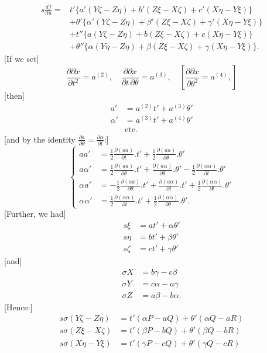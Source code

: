 %
\noindent [hence, by 12:]
\[
\begin{aligned}
s\frac{df}{du}={}&t'\{a'(Y\zeta-Z\eta)+b'(Z\xi-X\zeta)+c'(X\eta-Y\xi)\}\\
&+\theta'\{\alpha'(Y\zeta-Z\eta)+\beta'(Z\xi-X\zeta)+\gamma'(X\eta-Y\xi)\}\\
&+t''\{a(Y\zeta-Z\eta)+b(Z\xi-X\zeta)+c(X\eta-Y\xi)\}\\
&+\theta''\{\alpha(Y\eta-Z\eta)+\beta(Z\xi-X\zeta)+\gamma(X\eta-Y\xi)\}.
\end{aligned}
\]
[If we set]
\[
\frac{\partial\partial x}{\partial t^2}=a^{(2)},\quad
\frac{\partial\partial x}{\partial t\,\partial\theta}=a^{(3)},\quad
\left[\frac{\partial\partial x}{\partial\theta^2}=a^{(4)},\right]
\]
[then]
\[
\begin{aligned}
a'&=a^{(2)}t'+a^{(3)}\theta'\\
\alpha'&=a^{(3)}t'+a^{(4)}\theta'\\
&\text{etc.}
\end{aligned}
\]
[and by the identity $\frac{\partial a}{\partial\theta}=\frac{\partial\alpha}{\partial t}$:]
\begin{equation}\tag*{[15]}
\left\{\begin{aligned}
aa'&=\tfrac12\frac{\partial(aa)}{\partial t}.t'+\tfrac12\frac{\partial(aa)}{\partial\theta}.\theta'\\
a\alpha'&=\tfrac12\frac{\partial(aa)}{\partial\theta}.t'+\frac{\partial(a\alpha)}{\partial\theta}.\theta'-\tfrac12\frac{\partial(\alpha\alpha)}{\partial t}.\theta'\\
\alpha a'&=-\tfrac12\frac{\partial(aa)}{\partial\theta}.t'+\frac{\partial(a\alpha)}{\partial t}.t'+\tfrac12\frac{\partial(\alpha\alpha)}{\partial t}.\theta'\\
\alpha\alpha'&=\tfrac12\frac{\partial(\alpha\alpha)}{\partial t}.t'+\tfrac12\frac{\partial(\alpha\alpha)}{\partial\theta}.\theta'.
\end{aligned}\right.
\end{equation}
[Further, we had]
\[
\begin{aligned}s\xi&=at'+\alpha\theta'\\s\eta&=bt'+\beta\theta'\\s\zeta&=ct'+\gamma\theta'\end{aligned}
\]
[and]
\[
\begin{aligned}
\sigma X&=b\gamma-c\beta\\
\sigma Y&=c\alpha-a\gamma\\
\sigma Z&=a\beta-b\alpha.
\end{aligned}
\]
[Hence:]
\[
\begin{aligned}
s\sigma(Y\zeta-Z\eta)&=t'(\alpha P-aQ)+\theta'(\alpha Q-aR)\\
s\sigma(Z\xi-X\zeta)&=t'(\beta P-bQ)+\theta'(\beta Q-bR)\\
s\sigma(X\eta-Y\xi)&=t'(\gamma P-cQ)+\theta'(\gamma Q-cR)
\end{aligned}
\]
